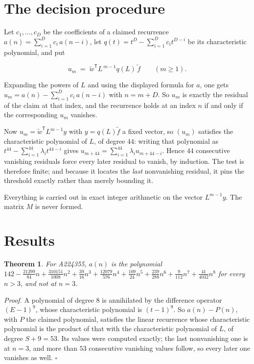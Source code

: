 \documentclass[11pt]{article}
\newtheorem{theorem}{Theorem}
\theoremstyle{definition}
\begin{document}
\section{The decision procedure}

Let $c_1,\dots,c_D$ be the coefficients of a claimed recurrence $a(n) = \sum_{i=1}^{D} c_i\,a(n-i)$, let $q(t) = t^{D} - \sum_{i=1}^{D} c_i t^{D-i}$ be its characteristic polynomial, and put

\[u_m \;=\; \tilde w^{\mathsf T} L^{\,m-1} q(L)\,\tilde f \qquad (m \ge 1).\]

Expanding the powers of $L$ and using the displayed formula for $a$, one gets $u_m = a(n) - \sum_{i=1}^{D} c_i\,a(n-i)$ with $n = m + D$. So $u_m$ is exactly the residual of the claim at that index, and the recurrence holds at an index $n$ if and only if the corresponding $u_m$ vanishes.

Now $u_m = \tilde w^{\mathsf T} L^{m-1} y$ with $y = q(L)\tilde f$ a fixed vector, so $(u_m)$ satisfies the characteristic polynomial of $L$, of degree $44$: writing that polynomial as $t^{44} - \sum_{i=1}^{44} \lambda_i t^{44-i}$ gives $u_{m+44} = \sum_{i=1}^{44} \lambda_i u_{m+44-i}$. Hence $44$ consecutive vanishing residuals force every later residual to vanish, by induction. The test is therefore finite; and because it locates the {\itshape last} nonvanishing residual, it pins the threshold exactly rather than merely bounding it.

Everything is carried out in exact integer arithmetic on the vector $L^{m-1}y$. The matrix $M$ is never formed.

\section{Results}

\begin{theorem} For A224355, $a(n)$ is the polynomial $142 - \frac{21299}{84}n + \frac{310151}{1008}n^{2} + \frac{39}{16}n^{3} + \frac{12079}{576}n^{4} + \frac{109}{24}n^{5} + \frac{239}{288}n^{6} + \frac{9}{112}n^{7} + \frac{41}{4032}n^{8}$ for every $n > 3$, and not at $n = 3$.\end{theorem}

{\itshape Proof.} A polynomial of degree $8$ is annihilated by the difference operator $(E-1)^{9}$, whose characteristic polynomial is $(t-1)^{9}$. So $a(n) - P(n)$, with $P$ the claimed polynomial, satisfies the linear recurrence whose characteristic polynomial is the product of that with the characteristic polynomial of $L$, of degree $S + 9 = 53$. Its values were computed exactly; the last nonvanishing one is at $n = 3$, and more than $53$ consecutive vanishing values follow, so every later one vanishes as well. $\square$
\end{document}
